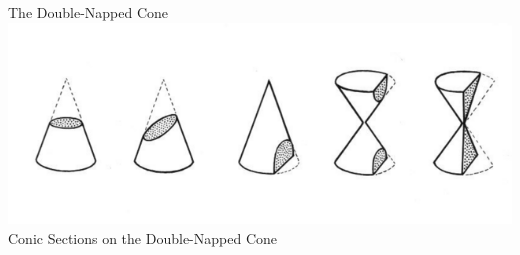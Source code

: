 \documentclass[14pt,aspectratio=169]{beamer}
\begin{document}
\begin{frame}{The Double-Napped Cone}
    \centering
    \includegraphics{image06}\\
    Conic Sections on the Double-Napped Cone


\end{frame}
\end{document}
